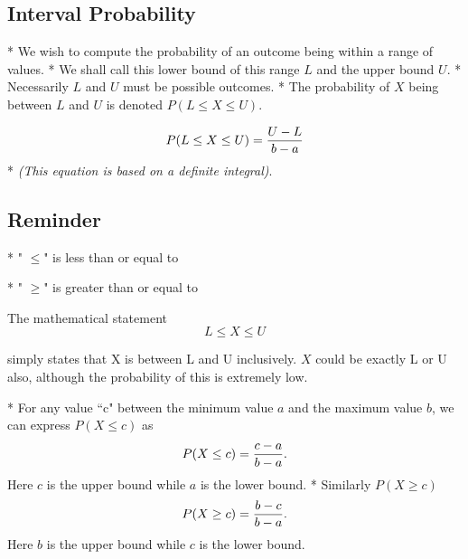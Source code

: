 \documentclass[a4paper,12pt]{article}
\begin{document}
\begin{framed}



\subsection*{Interval Probability}


* We wish to compute the probability of an outcome being within a range of values.
* We shall call this lower bound of this range $L$ and the upper bound $ U$.
* Necessarily $L$ and $U$ must be possible outcomes.
* The probability of $X$ being between $L$ and $U$ is denoted $P( L \leq X \leq U )$.

\[
P( L \leq X \leq U ) = { U - L \over b - a}
\]
* \textit{(This equation is based on a definite integral)}.





\subsection*{Reminder}


* " $\leq$" is less than or equal to

* " $\geq$" is greater than or equal to


The mathematical statement
\[L \leq X \leq U\]

simply states that X is between L and U inclusively. $X$ could be exactly L or U also, although the probability of this is extremely low.




* For any value ``c" between the minimum value $a$ and the maximum
value $b$, we can express $P(X \leq c)$ as
\[P(X \leq c) = {c-a \over b-a}.\]
Here $c$ is the upper bound while $a$ is the lower bound.
* Similarly $P(X \geq c)$ \[P(X \geq c) = {b-c \over b-a}.\]
Here $b$ is the upper bound while $c$ is the lower bound.












\end{framed}
\end{document}
